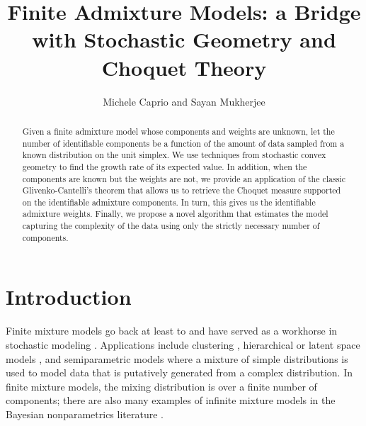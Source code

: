 \documentclass[12pt, reqno]{amsart}
\author[M.~Caprio and S.~Mukherjee]{Michele Caprio and Sayan Mukherjee}
\title{Finite Admixture Models: a Bridge with Stochastic Geometry and Choquet Theory}
\theoremstyle{definition}
\begin{document}
\begin{abstract}
Given a finite admixture model whose components and weights are unknown, let the number of identifiable components be a function of the amount of data sampled from a known distribution on the unit simplex. We use techniques from stochastic convex geometry to find the growth rate of its expected value. In addition, when the components are known but the weights are not, we provide an application of the classic Glivenko-Cantelli's theorem that allows us to retrieve the Choquet measure supported on the identifiable admixture components. In turn, this gives us the identifiable admixture weights. Finally, we propose a novel algorithm that estimates the model capturing the complexity of the data using only the strictly necessary number of components.
\end{abstract}

\maketitle
\thispagestyle{empty}

\section{Introduction}\label{intro}
Finite mixture models go back at least to \cite{pearson2,pearson1} and have served as a workhorse in stochastic modeling \cite{everitt,lindsay,mengersen}. Applications include clustering \cite{mclachlan1}, hierarchical or latent space models \cite{masyn}, and semiparametric models \cite{mcnicholas} where a mixture of simple distributions is used to model data that is putatively generated from a complex distribution. In finite mixture models, the mixing distribution is over a finite number of components; there are also many examples of infinite mixture models in the Bayesian nonparametrics literature \cite{antoniak1974,west94}. 
\end{document}
